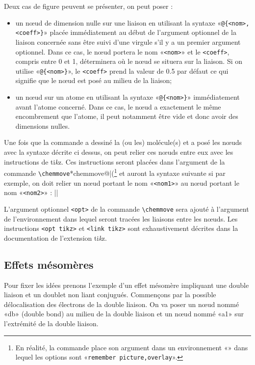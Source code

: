 \documentclass[10pt]{article}
\makeatletter
\newcommand\idx{\@ifstar{\let\print@or@not\@gobble\idx@}{\let\print@or@not\@firstofone\idx@}}
\newcommand\idx@[1]{%
	\ifcat\expandafter\noexpand\@car#1\@nil\relax%
		\expandafter\ifx\@car#1\@nil\protect
			\index{#1}%
			\print@or@not{#1}%
		\else
			\saveexpandmode\expandarg
			\StrSubstitute{\string#1}{\string @}{\@empty\protect\symbol{'100}}[\temp@]%
			\StrGobbleLeft\temp@1[\temp@]%
			\restoreexpandmode
			\expandafter\index\expandafter{\temp@ @\protect\texttt{\protect\textbackslash\temp@}}%
			\print@or@not{\texttt{\string#1}}%
		\fi
	\else
		\index{#1}%
		\print@or@not{#1}%
	\fi
}
\newcommand\TIKZ{ti\textit kz\xspace}
\makeatother
\begin{document}
Deux cas de figure peuvent se présenter, on peut poser :
\begin{itemize}
	\item un nœud de dimension nulle sur une liaison en utilisant la syntaxe «\verb-@{<nom>,<coeff>}-» placée immédiatement au début de l'argument optionnel de la liaison concernée sans être suivi d'une virgule s'il y a un premier argument optionnel. Dans ce cas, le nœud portera le nom «\verb-<nom>-» et le \verb-<coeff>-, compris entre 0 et 1, déterminera où le nœud se situera sur la liaison. Si on utilise «\verb-@{<nom>}-», le \verb-<coeff>- prend la valeur de 0.5 par défaut ce qui signifie que le nœud est posé au milieu de la liaison;
	\item un nœud sur un atome en utilisant la syntaxe «\verb-@{<nom>}-» immédiatement avant l'atome concerné. Dans ce cas, le nœud a exactement le même encombrement que l'atome, il peut notamment être vide et donc avoir des dimensions nulles.
\end{itemize}
Une fois que la commande \idx{\chemfig} a dessiné la (ou les) molécule(s) et a posé les nœuds avec la syntaxe décrite ci dessus, on peut relier ces nœuds entre eux avec les instructions de \TIKZ. Ces instructions seront placées dans l'argument de la commande \verb-\chemmove-\idx*{chemmove@\protect\texttt{\protect\string\protect\chemmove}|(}\footnote{En réalité, la commande \texttt{\string\chemmove} place son argument dans un environnement «\idx{tikzpicture}» dans lequel les options sont «\texttt{remember picture,overlay}».} et auront la syntaxe suivante si par exemple, on doit relier un nœud portant le nom «\verb-<nom1>-» au nœud portant le nom «\verb-<nom2>-» :
\centerverb||
\smallskip

L'argument optionnel \verb-<opt>- de la commande \verb-\chemmove- sera ajouté à l'argument de l'environnement \idx{tikzpicture} dans lequel seront tracées les liaisons entre les nœuds. Les instructions \verb-<opt tikz>- et \verb-<link tikz>- sont exhaustivement décrites dans la documentation de l'extension \TIKZ.

\subsection{Effets mésomères}
Pour fixer les idées prenons l'exemple d'un effet mésomère impliquant une double liaison et un doublet non liant conjugués. Commençons par la possible délocalisation des électrons de la double liaison. On va poser un nœud nommé «db» (double bond) au milieu de la double liaison et un nœud nommé «a1» sur l'extrémité de la double liaison.
\end{document}
